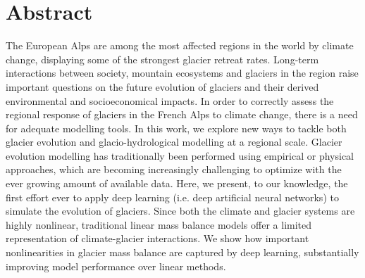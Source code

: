 
\section*{Abstract}

The European Alps are among the most affected regions in the world by climate change, displaying some of the strongest glacier retreat rates. Long-term interactions between society, mountain ecosystems and glaciers in the region raise important questions on the future evolution of glaciers and their derived environmental and socioeconomical impacts. In order to correctly assess the regional response of glaciers in the French Alps to climate change, there is a need for adequate modelling tools. In this work, we explore new ways to tackle both glacier evolution and glacio-hydrological modelling at a regional scale. Glacier evolution modelling has traditionally been performed using empirical or physical approaches, which are becoming increasingly challenging to optimize with the ever growing amount of available data. Here, we present, to our knowledge, the first effort ever to apply deep learning (i.e. deep artificial neural networks) to simulate the evolution of glaciers. Since both the climate and glacier systems are highly nonlinear, traditional linear mass balance models offer a limited representation of climate-glacier interactions. We show how important nonlinearities in glacier mass balance are captured by deep learning, substantially improving model performance over linear methods. 

